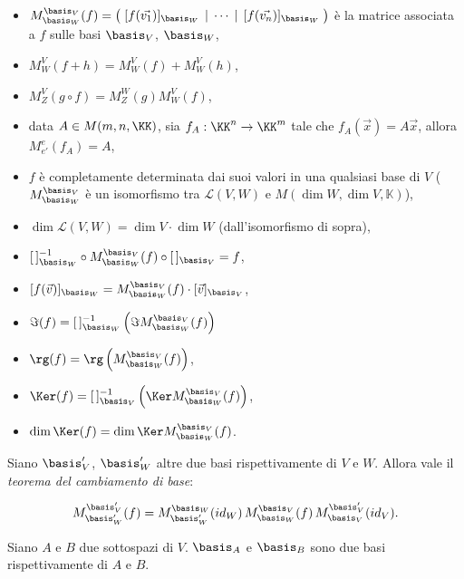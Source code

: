 \documentclass[10pt,landscape]{article}
\begin{document}
\begin{multicols}{3}
\begin{itemize}
			\item $M^{\basis_V}_{\basis_W}(f) = \begin{pmatrix} \; [f(\vec{v_1})]_{\basis_W} \, \mid \, \cdots \, \mid \, [f(\vec{v_n})]_{\basis_W} \; \end{pmatrix}$ è la matrice
			associata a $f$ sulle basi $\basis_V$, $\basis_W$,
			\item $M^V_W(f + h) = M^V_W(f) + M^V_W(h)$,
			\item $M^V_Z(g \circ f) = M^W_Z(g) M^V_W(f)$,
			\item data $A \in M(m, n, \KK)$, sia $f_A : \KK^n \to \KK^m$ tale
			che $f_A(\vec{x}) = A \vec{x}$, allora $M^{e}_{e'}(f_A) = A$,
			\item $f$ è completamente determinata dai suoi valori in una
			qualsiasi base di $V$ ($M^{\basis_V}_{\basis_W}$ è un isomorfismo
			tra $\mathcal{L}(V, W)$ e $M(\dim W, \dim V, \mathbb{K})$),
			\item $\dim \mathcal{L}(V, W) = \dim V \cdot \dim W$ (dall'isomorfismo
			di sopra),
			\item $[\,]^{-1}_{\basis_W} \circ M^{\basis_V}_{\basis_W}(f) \circ
			{[\,]_{\basis_V}} = f$,
			\item $[f(\vec{v})]_{\basis_W} = M^{\basis_V}_{\basis_W}(f) \cdot
			[\vec{v}]_{\basis_V}$,
			\item $\Im(f) = [\,]^{-1}_{\basis_W}\left(\Im M^{\basis_V}_{\basis_W}(f)\right)$
			\item $\rg(f) = \rg\left(M^{\basis_V}_{\basis_W}(f)\right)$,
			\item $\Ker(f) = [\,]^{-1}_{\basis_V}\left(\Ker M^{\basis_V}_{\basis_W}(f)\right)$,
			\item $\dim \Ker(f) = \dim \Ker M^{\basis_V}_{\basis_W}(f)$.
		\end{itemize}
		
		Siano $\basis_V'$, $\basis_W'$ altre due basi rispettivamente
		di $V$ e $W$. Allora vale il \textit{teorema del cambiamento
			di base}:
		
		\[ M^{\basis_V'}_{\basis_W'}(f) = M^{\basis_W}_{\basis_W'}(id_W) \,
		M^{\basis_V}_{\basis_W}(f) \, M^{\basis_V'}_{\basis_V}(id_V).\]
		
		Siano $A$ e $B$ due sottospazi di $V$. $\basis_A$ e $\basis_B$ sono
		due basi rispettivamente di $A$ e $B$.
		

\end{multicols}
\end{document}

